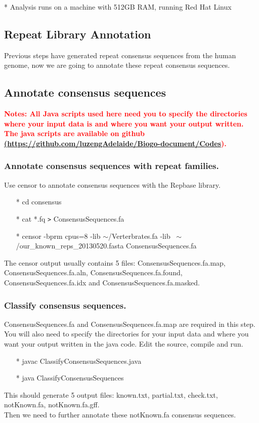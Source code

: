 \documentclass[12pt]{report}
\begin{document}
* Analysis runs on a machine with 512GB RAM, running Red Hat Linux \\


\subsection*{Repeat Library Annotation}
Previous steps have generated repeat consensus sequences from the human genome, now we are going to annotate these repeat consensus sequences.

\subsection*{Annotate consensus sequences}
\textbf{\textcolor{red}{Notes: All Java scripts used here need you to specify the directories where your input data is and where you want your output written. The java scripts are available on github \href{<url>}(\url{https://github.com/luzengAdelaide/Biogo-document/Codes}). }}

\subsubsection*{Annotate consensus sequences with repeat families.}
Use censor to annotate consensus sequences with the Repbase library. 
\begin{enumerate}
	\item[*] cd consensus
	\item[*] cat *.fq \texttt{>} ConsensusSequences.fa 
	\item[*] censor -bprm cpus=8 -lib $\sim$/Verterbrates.fa -lib ~$\sim$/our\_known\_reps\_20130520.fasta ConsensusSequences.fa 
\end{enumerate}
The censor output usually contains 5 files: ConsensusSequences.fa.map, ConsensusSequences.fa.aln, ConsensusSequences.fa.found, ConsensusSequences.fa.idx and ConsensusSequences.fa.masked.  \\

\subsubsection*{Classify consensus sequences.}
ConsensusSequences.fa and ConsensusSequences.fa.map are required in this step. You will also need to specify the directories for your input data and where you want your output written in the java code. Edit the source, compile and run.\\
\begin{enumerate}
	\item[*] javac ClassifyConsensusSequences.java
	\item[*] java ClassifyConsensusSequences
\end{enumerate}
This should generate 5 output files: known.txt, partial.txt, check.txt, notKnown.fa, notKnown.fa.gff. \\
Then we need to further annotate these notKnown.fa consensus sequences. 
\end{document}
